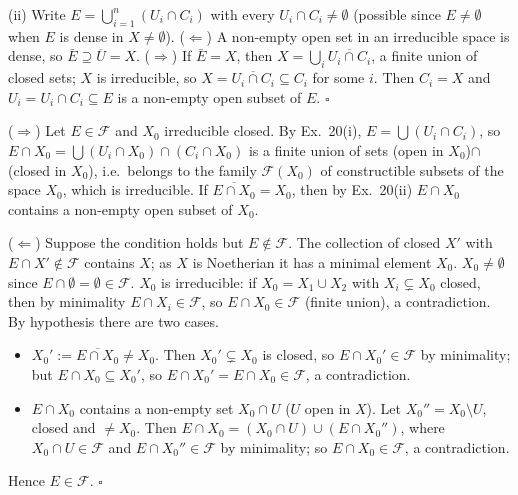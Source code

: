 \documentclass[11pt]{article}
\begin{document}
(ii) Write $E=\bigcup_{i=1}^n(U_i\cap C_i)$ with every $U_i\cap C_i\ne\emptyset$ (possible since $E\ne\emptyset$ when $E$ is dense in $X\ne\emptyset$).
($\Leftarrow$) A non-empty open set in an irreducible space is dense, so $\bar E\supseteq\overline{U}=X$.
($\Rightarrow$) If $\bar E=X$, then $X=\bigcup_i\overline{U_i\cap C_i}$, a finite union of closed sets; $X$ is irreducible, so $X=\overline{U_i\cap C_i}\subseteq C_i$ for some $i$. Then $C_i=X$ and $U_i=U_i\cap C_i\subseteq E$ is a non-empty open subset of $E$. \hfill$\square$

\pf
($\Rightarrow$) Let $E\in\mathcal F$ and $X_0$ irreducible closed. By Ex.~20(i), $E=\bigcup(U_i\cap C_i)$, so $E\cap X_0=\bigcup(U_i\cap X_0)\cap(C_i\cap X_0)$ is a finite union of sets (open in $X_0$)$\cap$(closed in $X_0$), i.e.\ belongs to the family $\mathcal F(X_0)$ of constructible subsets of the space $X_0$, which is irreducible. If $\overline{E\cap X_0}=X_0$, then by Ex.~20(ii) $E\cap X_0$ contains a non-empty open subset of $X_0$.

($\Leftarrow$) Suppose the condition holds but $E\notin\mathcal F$. The collection of closed $X'$ with $E\cap X'\notin\mathcal F$ contains $X$; as $X$ is Noetherian it has a minimal element $X_0$. $X_0\ne\emptyset$ since $E\cap\emptyset=\emptyset\in\mathcal F$. $X_0$ is irreducible: if $X_0=X_1\cup X_2$ with $X_i\subsetneq X_0$ closed, then by minimality $E\cap X_i\in\mathcal F$, so $E\cap X_0\in\mathcal F$ (finite union), a contradiction. By hypothesis there are two cases.
\begin{itemize}[leftmargin=*]
\item $X_0':=\overline{E\cap X_0}\ne X_0$. Then $X_0'\subsetneq X_0$ is closed, so $E\cap X_0'\in\mathcal F$ by minimality; but $E\cap X_0\subseteq X_0'$, so $E\cap X_0'=E\cap X_0\in\mathcal F$, a contradiction.
\item $E\cap X_0$ contains a non-empty set $X_0\cap U$ ($U$ open in $X$). Let $X_0''=X_0\setminus U$, closed and $\ne X_0$. Then $E\cap X_0=(X_0\cap U)\cup(E\cap X_0'')$, where $X_0\cap U\in\mathcal F$ and $E\cap X_0''\in\mathcal F$ by minimality; so $E\cap X_0\in\mathcal F$, a contradiction.
\end{itemize}
Hence $E\in\mathcal F$. \hfill$\square$
\end{document}
